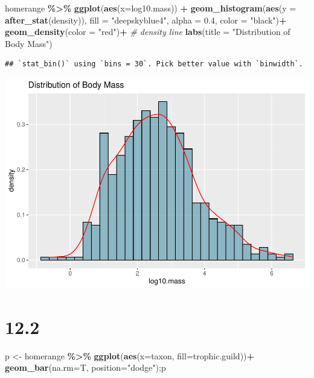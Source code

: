 \documentclass[
]{article}
\newenvironment{Shaded}{\begin{snugshade}}{\end{snugshade}}
\newcommand{\AttributeTok}[1]{\textcolor[rgb]{0.13,0.29,0.53}{#1}}
\newcommand{\CommentTok}[1]{\textcolor[rgb]{0.56,0.35,0.01}{\textit{#1}}}
\newcommand{\FloatTok}[1]{\textcolor[rgb]{0.00,0.00,0.81}{#1}}
\newcommand{\FunctionTok}[1]{\textcolor[rgb]{0.13,0.29,0.53}{\textbf{#1}}}
\newcommand{\NormalTok}[1]{#1}
\newcommand{\OtherTok}[1]{\textcolor[rgb]{0.56,0.35,0.01}{#1}}
\newcommand{\SpecialCharTok}[1]{\textcolor[rgb]{0.81,0.36,0.00}{\textbf{#1}}}
\newcommand{\StringTok}[1]{\textcolor[rgb]{0.31,0.60,0.02}{#1}}
\begin{document}
\begin{Shaded}
\begin{Highlighting}[]
\NormalTok{homerange }\SpecialCharTok{\%\textgreater{}\%} 
  \FunctionTok{ggplot}\NormalTok{(}\FunctionTok{aes}\NormalTok{(}\AttributeTok{x=}\NormalTok{log10.mass)) }\SpecialCharTok{+}
  \FunctionTok{geom\_histogram}\NormalTok{(}\FunctionTok{aes}\NormalTok{(}\AttributeTok{y =} \FunctionTok{after\_stat}\NormalTok{(density)), }\AttributeTok{fill =} \StringTok{"deepskyblue4"}\NormalTok{, }\AttributeTok{alpha =} \FloatTok{0.4}\NormalTok{, }\AttributeTok{color =} \StringTok{"black"}\NormalTok{)}\SpecialCharTok{+}
  \FunctionTok{geom\_density}\NormalTok{(}\AttributeTok{color =} \StringTok{"red"}\NormalTok{)}\SpecialCharTok{+} \CommentTok{\# density line}
  \FunctionTok{labs}\NormalTok{(}\AttributeTok{title =} \StringTok{"Distribution of Body Mass"}\NormalTok{)}
\end{Highlighting}
\end{Shaded}

\begin{verbatim}
## `stat_bin()` using `bins = 30`. Pick better value with `binwidth`.
\end{verbatim}

\includegraphics{Untitled_files/figure-latex/unnamed-chunk-38-1.pdf}

\hypertarget{section}{%
\section{12.2}\label{section}}

\begin{Shaded}
\begin{Highlighting}[]
\NormalTok{p }\OtherTok{\textless{}{-}}\NormalTok{ homerange }\SpecialCharTok{\%\textgreater{}\%} 
  \FunctionTok{ggplot}\NormalTok{(}\FunctionTok{aes}\NormalTok{(}\AttributeTok{x=}\NormalTok{taxon, }\AttributeTok{fill=}\NormalTok{trophic.guild))}\SpecialCharTok{+}
  \FunctionTok{geom\_bar}\NormalTok{(}\AttributeTok{na.rm=}\NormalTok{T, }\AttributeTok{position=}\StringTok{"dodge"}\NormalTok{);p}
\end{Highlighting}
\end{Shaded}
\end{document}
